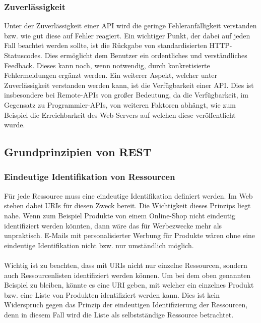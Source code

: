 \subsubsection{Zuverlässigkeit}
Unter der Zuverlässigkeit einer \gls{API} wird die geringe Fehleranfälligkeit verstanden bzw. wie gut diese auf Fehler reagiert. Ein wichtiger Punkt, der dabei auf jeden Fall beachtet werden sollte, ist die Rückgabe von standardisierten HTTP-Statuscodes. Dies ermöglicht dem Benutzer ein ordentliches und verständliches Feedback. Dieses kann noch, wenn notwendig, durch konkretisierte Fehlermeldungen ergänzt werden. Ein weiterer Aspekt, welcher unter Zuverlässigkeit verstanden werden kann, ist die Verfügbarkeit einer \gls{API}. Dies ist insbesondere bei Remote-\glspl{API} von großer Bedeutung, da die Verfügbarkeit, im Gegensatz zu Programmier-\glspl{API}, von weiteren Faktoren abhängt, wie zum Beispiel die Erreichbarkeit des Web-Servers auf welchen diese veröffentlicht wurde.

\subsection{Grundprinzipien von REST}\label{sec:basePrincipleREST}
\subsubsection{Eindeutige Identifikation von Ressourcen}
Für jede Ressource muss eine eindeutige Identifikation definiert werden. Im Web stehen dabei \glspl{URI} für diesen Zweck bereit. Die Wichtigkeit dieses Prinzips liegt nahe. Wenn zum Beispiel Produkte von einem Online-Shop nicht eindeutig identifiziert werden könnten, dann wäre das für Werbezwecke mehr als unpraktisch. E-Mails mit personalisierter Werbung für Produkte wären ohne eine eindeutige Identifikation nicht bzw. nur umständlich möglich.\\
\\
Wichtig ist zu beachten, dass mit \glspl{URI} nicht nur einzelne Ressourcen, sondern auch Ressourcenlisten identifiziert werden können. Um bei dem oben genannten Beispiel zu bleiben, könnte es eine \gls{URI} geben, mit welcher ein einzelnes Produkt bzw. eine Liste von Produkten identifiziert werden kann. Dies ist kein Widerspruch gegen das Prinzip der eindeutigen Identifizierung der Ressourcen, denn in diesem Fall wird die Liste als selbstständige Ressource betrachtet.

